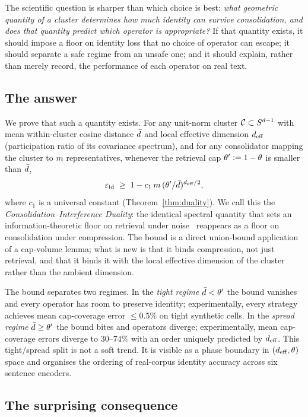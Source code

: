 The scientific question is sharper than which choice is best:
\emph{what geometric quantity of a cluster determines how much
identity can survive consolidation, and does that quantity predict
which operator is appropriate?} If that quantity exists, it should
impose a floor on identity loss that no choice of operator can
escape; it should separate a safe regime from an unsafe one; and it
should explain, rather than merely record, the performance of each
operator on real text.

\subsection{The answer}
\label{sec:intro:answer}

We prove that such a quantity exists. For any unit-norm cluster
$\mathcal{C} \subset S^{d-1}$ with mean within-cluster cosine distance
$\bar{d}$ and local effective dimension ${d_{\mathrm{eff}}}$ (participation ratio of
its covariance spectrum), and for any consolidator mapping the
cluster to $m$ representatives, whenever the retrieval cap $\theta'
:= 1-\theta$ is smaller than $\bar{d}$,
\[
\varepsilon_{\mathrm{id}} \;\geq\; 1 - c_1\,m\,(\theta'/\bar{d})^{{d_{\mathrm{eff}}}/2},
\]
where $c_1$ is a universal constant (Theorem~\ref{thm:duality}). We
call this the \emph{Consolidation--Interference Duality}: the
identical spectral quantity that sets an information-theoretic floor
on retrieval under noise~\cite{priceOfMeaning2026} reappears as a
floor on consolidation under compression. The bound is a direct
union-bound application of a cap-volume lemma; what is new is that
it binds compression, not just retrieval, and that it binds it with
the local effective dimension of the cluster rather than the ambient
dimension.

The bound separates two regimes. In the \emph{tight regime}
$\bar{d} < \theta'$ the bound vanishes and every operator has room to
preserve identity; experimentally, every strategy achieves mean
cap-coverage error $\leq 0.5\%$ on tight synthetic cells. In the
\emph{spread regime} $\bar{d} \geq \theta'$ the bound bites and
operators diverge; experimentally, mean cap-coverage errors diverge
to $30$--$74\%$ with an order uniquely predicted by ${d_{\mathrm{eff}}}$. This
tight/spread split is not a soft trend. It is visible as a phase
boundary in $({d_{\mathrm{eff}}}, \theta)$ space and organises the ordering of
real-corpus identity accuracy across six sentence encoders.

\subsection{The surprising consequence}
\label{sec:intro:consequence}

